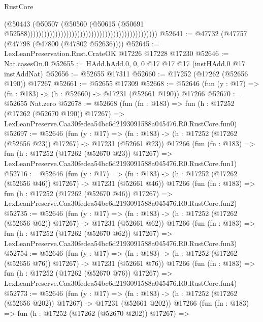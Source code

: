 \begin{lexlean}{RustCore}
\begin{coremodule}
                                                                                        (@50443
                                                                                          (@50507
                                                                                            (@50560
                                                                                              (@50615
                                                                                                (@50691
                                                                                                  @52588)))))))))))))))))))))))))))))))))))))))))))))))
@52641 := @47732 (@47757 (@47798 (@47800 (@47802 @52636))))
@52645 := LexLeanPreservation.Rust.CrateOK @17226 @17228 @17230
@52646 := Nat.casesOn.{0}
@52655 := HAdd.hAdd.{0, 0, 0} @17 @17 @17 (instHAdd.{0} @17 instAddNat)
@52656 := @52655 @17311
@52660 := @17252 (@17262 (@52656 @190)) @17267
@52661 := @52655 @17309
@52668 := @52646 (fun (y : @17) => (fn : @183) -> (h : @52660) -> @17231 (@52661 @190)) @17266
@52670 := @52655 Nat.zero
@52678 := @52668
    (fun (fn : @183) =>
    fun (h : @17252 (@17262 (@52670 @190)) @17267) =>
    LexLeanPreserve.Caa30fedea54bc6d2193091588a045476.R0.RustCore.fun0)
@52697 := @52646
    (fun (y : @17) =>
    (fn : @183) -> (h : @17252 (@17262 (@52656 @23)) @17267) -> @17231 (@52661 @23))
    @17266
    (fun (fn : @183) =>
    fun (h : @17252 (@17262 (@52670 @23)) @17267) =>
    LexLeanPreserve.Caa30fedea54bc6d2193091588a045476.R0.RustCore.fun1)
@52716 := @52646
    (fun (y : @17) =>
    (fn : @183) -> (h : @17252 (@17262 (@52656 @46)) @17267) -> @17231 (@52661 @46))
    @17266
    (fun (fn : @183) =>
    fun (h : @17252 (@17262 (@52670 @46)) @17267) =>
    LexLeanPreserve.Caa30fedea54bc6d2193091588a045476.R0.RustCore.fun2)
@52735 := @52646
    (fun (y : @17) =>
    (fn : @183) -> (h : @17252 (@17262 (@52656 @62)) @17267) -> @17231 (@52661 @62))
    @17266
    (fun (fn : @183) =>
    fun (h : @17252 (@17262 (@52670 @62)) @17267) =>
    LexLeanPreserve.Caa30fedea54bc6d2193091588a045476.R0.RustCore.fun3)
@52754 := @52646
    (fun (y : @17) =>
    (fn : @183) -> (h : @17252 (@17262 (@52656 @76)) @17267) -> @17231 (@52661 @76))
    @17266
    (fun (fn : @183) =>
    fun (h : @17252 (@17262 (@52670 @76)) @17267) =>
    LexLeanPreserve.Caa30fedea54bc6d2193091588a045476.R0.RustCore.fun4)
@52773 := @52646
    (fun (y : @17) =>
    (fn : @183) -> (h : @17252 (@17262 (@52656 @202)) @17267) -> @17231 (@52661 @202))
    @17266
    (fun (fn : @183) =>
    fun (h : @17252 (@17262 (@52670 @202)) @17267) =>

\end{coremodule}
\end{lexlean}
